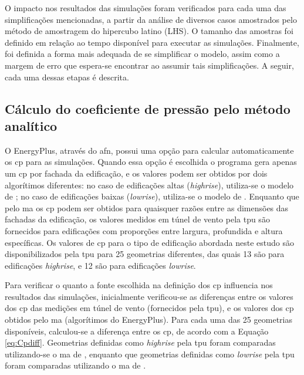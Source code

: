 O impacto nos resultados das simulações foram verificados para cada uma das simplificações mencionadas, a partir da análise de diversos casos amostrados pelo método de amostragem do hipercubo latino (LHS). O tamanho das amostras foi definido em relação ao tempo disponível para executar as simulações.
Finalmente, foi definida a forma mais adequada de se simplificar o modelo, assim como a margem de erro que espera-se encontrar ao assumir tais simplificações.
A seguir, cada uma dessas etapas é descrita.

\subsection*{Cálculo do coeficiente de pressão pelo método analítico}

O EnergyPlus, através do \acrshort{afn}, possui uma opção para calcular automaticamente os \acrshort{cp} para as simulações.
Quando essa opção é escolhida o programa gera apenas um \acrshort{cp} por fachada da edificação, e os valores podem ser obtidos por dois algorítimos diferentes: no caso de edificações altas (\textit{highrise}), utiliza-se o modelo de ; no caso de edificações baixas (\textit{lowrise}), utiliza-se o modelo de .
Enquanto que pelo \acrlong{ma} os \acrshort{cp} podem ser obtidos para quaisquer razões entre as dimensões das fachadas da edificação, os valores medidos em túnel de vento pela \acrshort{tpu} são fornecidos para edificações com proporções entre largura, profundida e altura específicas.
Os valores de \acrshort{cp} para o tipo de edificação abordada neste estudo são disponibilizados pela \acrshort{tpu} para 25 geometrias diferentes, das quais 13 são para edificações \textit{highrise}, e 12 são para edificações \textit{lowrise}.

Para verificar o quanto a fonte escolhida na definição dos \acrshort{cp} influencia nos resultados das simulações, inicialmente verificou-se as diferenças entre os valores dos \acrshort{cp} das medições em túnel de vento (fornecidos pela \acrshort{tpu}), e os valores dos \acrshort{cp} obtidos pelo \acrlong{ma} (algorítimos do EnergyPlus). Para cada uma das 25 geometrias disponíveis, calculou-se a diferença entre os \acrshort{cp}, de acordo com a Equação \ref{eq:Cpdiff}. 
Geometrias definidas como \textit{highrise} pela \acrshort{tpu} foram comparadas utilizando-se o \acrlong{ma} de , enquanto que geometrias definidas como \textit{lowrise} pela \acrshort{tpu} foram comparadas utilizando o \acrlong{ma} de .

